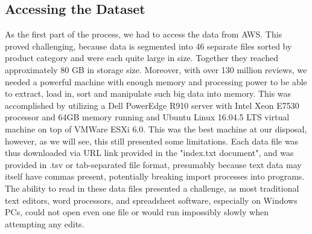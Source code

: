 \documentclass[10pt, conference, compsocconf]{IEEEtran}
\begin{document}
\subsection{Accessing the Dataset}

As the first part of the process, we had to access the data from AWS. This proved challenging, because data is segmented into 46 separate files sorted by product category and were each quite large in size. Together they reached approximately 80 GB in storage size. Moreover, with over 130 million reviews, we needed a powerful machine with enough memory and processing power to be able to extract, load in, sort and manipulate such big data into memory. This was accomplished by utilizing a Dell PowerEdge R910 server with Intel Xeon E7530 processor and 64GB memory running and Ubuntu Linux 16.04.5 LTS virtual machine on top of VMWare ESXi 6.0. This was the best machine at our disposal, however, as we will see, this still presented some limitations. Each data file was thus downloaded via URL link provided in the "index.txt document", and was provided in .tsv or tab-separated file format, presumably because text data may itself have commas present, potentially breaking import processes into programs. The ability to read in these data files presented a challenge, as most traditional text editors, word processors, and spreadsheet software, especially on Windows PCs, could not open even one file or would run impossibly slowly when attempting any edits.
\end{document}
